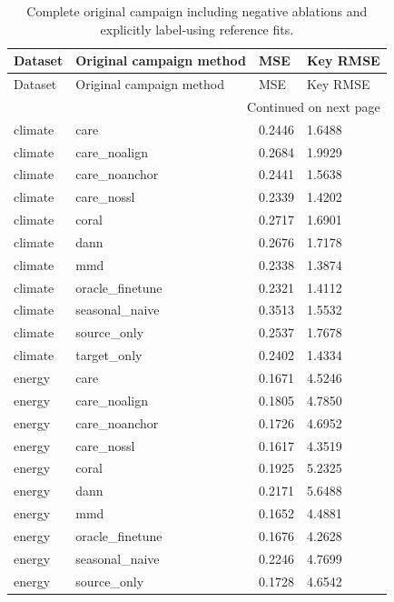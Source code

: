 {\footnotesize
\setlength{\tabcolsep}{3pt}
\renewcommand{\arraystretch}{1.17}
\begin{longtable}{@{}p{}p{}p{}p{}@{}}
\caption{Complete original campaign including negative ablations and explicitly label-using reference fits.}\label{tab:original_complete}\\
\toprule
Dataset & Original campaign method & MSE & Key RMSE \\
\midrule\endfirsthead
Dataset & Original campaign method & MSE & Key RMSE \\
\midrule\endhead
\midrule\multicolumn{4}{r}{Continued on next page}\\\endfoot
\bottomrule\endlastfoot
climate & care & 0.2446 & 1.6488 \\
climate & care\_\allowbreak{}noalign & 0.2684 & 1.9929 \\
climate & care\_\allowbreak{}noanchor & 0.2441 & 1.5638 \\
climate & care\_\allowbreak{}nossl & 0.2339 & 1.4202 \\
climate & coral & 0.2717 & 1.6901 \\
climate & dann & 0.2676 & 1.7178 \\
climate & mmd & 0.2338 & 1.3874 \\
climate & oracle\_\allowbreak{}finetune & 0.2321 & 1.4112 \\
climate & seasonal\_\allowbreak{}naive & 0.3513 & 1.5532 \\
climate & source\_\allowbreak{}only & 0.2537 & 1.7678 \\
climate & target\_\allowbreak{}only & 0.2402 & 1.4334 \\
energy & care & 0.1671 & 4.5246 \\
energy & care\_\allowbreak{}noalign & 0.1805 & 4.7850 \\
energy & care\_\allowbreak{}noanchor & 0.1726 & 4.6952 \\
energy & care\_\allowbreak{}nossl & 0.1617 & 4.3519 \\
energy & coral & 0.1925 & 5.2325 \\
energy & dann & 0.2171 & 5.6488 \\
energy & mmd & 0.1652 & 4.4881 \\
energy & oracle\_\allowbreak{}finetune & 0.1676 & 4.2628 \\
energy & seasonal\_\allowbreak{}naive & 0.2246 & 4.7699 \\
energy & source\_\allowbreak{}only & 0.1728 & 4.6542 \\

\end{longtable}}
